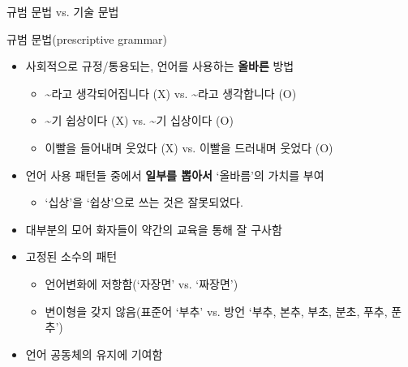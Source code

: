 \documentclass[11pt, aspectratio=169]{beamer}
\begin{document}
\begin{frame}[t]{규범 문법 vs. 기술 문법}
  \begin{block}{규범 문법(prescriptive grammar)}
    \begin{itemize}
      \item 사회적으로 규정/통용되는, 언어를 사용하는 \textbf{올바른} 방법
        \begin{itemize}
          \item \textasciitilde 라고 생각되어집니다 (X) vs. \textasciitilde 라고 생각합니다 (O)
          \item \textasciitilde 기 쉽상이다 (X) vs. \textasciitilde 기 십상이다 (O)
          \item 이빨을 들어내며 웃었다 (X) vs. 이빨을 드러내며 웃었다 (O)
        \end{itemize}
      \item 언어 사용 패턴들 중에서 \textbf{일부를 뽑아서} ‘올바름’의 가치를 부여
        \begin{itemize}
          \item ‘십상’을 ‘쉽상’으로 쓰는 것은 잘못되었다.
        \end{itemize}
      \item 대부분의 모어 화자들이 약간의 교육을 통해 잘 구사함
      \item 고정된 소수의 패턴
        \begin{itemize}
          \item 언어변화에 저항함(‘자장면’ vs. ‘짜장면’)
          \item 변이형을 갖지 않음(표준어 ‘부추’ vs. 방언 ‘부추, 본추, 부초, 분초, 푸추, 푼추’)
        \end{itemize}
      \item 언어 공동체의 유지에 기여함
    \end{itemize}    
  \end{block}
\end{frame}
\end{document}
